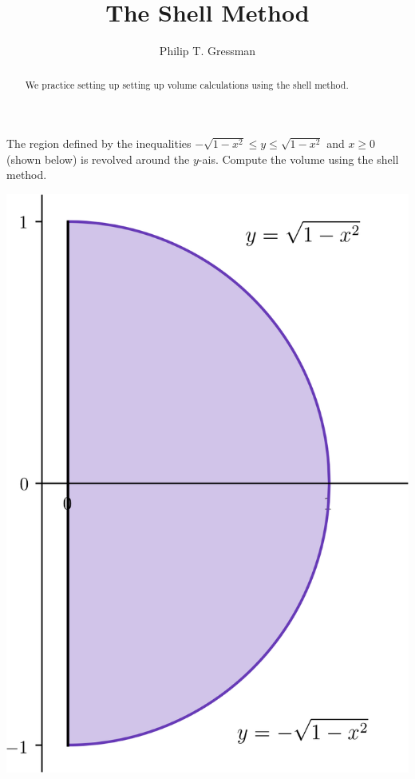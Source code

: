 \documentclass{ximera}
\title{The Shell Method}
\author{Philip T. Gressman}
\begin{document}
\begin{abstract}
We practice setting up setting up volume calculations using the shell method.
\end{abstract}
\maketitle

\begin{example}
The region defined by the inequalities $-\sqrt{1-x^2} \leq y \leq \sqrt{1-x^2}$ and $x \geq 0$ (shown below) is revolved around the $y$-ais. Compute the volume using the shell method.
\begin{center}
\begin{image}
\includegraphics{shell/shell01.png}
\end{image}
\end{center}

\end{example}
\end{document}
